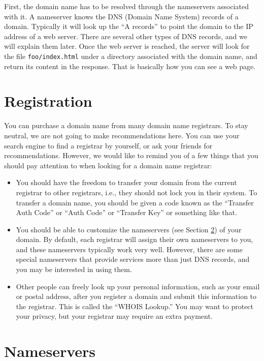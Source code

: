 \documentclass[12pt,]{krantz}
\theoremstyle{definition}
\theoremstyle{definition}
\theoremstyle{definition}
\theoremstyle{remark}
\begin{document}
First, the domain name has to be resolved through the nameservers
associated with it. A nameserver knows the DNS (Domain Name System)
records of a domain. Typically it will look up the ``A records'' to
point the domain to the IP address of a web server. There are several
other types of DNS records, and we will explain them later. Once the web
server is reached, the server will look for the file
\texttt{foo/index.html} under a directory associated with the domain
name, and return its content in the response. That is basically how you
can see a web page.

\section{Registration}\label{registration}

You can purchase a domain name from many domain name registrars. To stay
neutral, we are not going to make recommendations here. You can use your
search engine to find a registrar by yourself, or ask your friends for
recommendations. However, we would like to remind you of a few things
that you should pay attention to when looking for a domain name
registrar:

\begin{itemize}
\item
  You should have the freedom to transfer your domain from the current
  registrar to other registrars, i.e., they should not lock you in their
  system. To transfer a domain name, you should be given a code known as
  the ``Transfer Auth Code'' or ``Auth Code'' or ``Transfer Key'' or
  something like that.
\item
  You should be able to customize the nameservers (see Section
  \ref{nameservers}) of your domain. By default, each registrar will
  assign their own nameservers to you, and these nameservers typically
  work very well. However, there are some special nameservers that
  provide services more than just DNS records, and you may be interested
  in using them.
\item
  Other people can freely look up your personal information, such as
  your email or postal address, after you register a domain and submit
  this information to the registrar. This is called the ``WHOIS
  Lookup.'' You may want to protect your privacy, but your registrar may
  require an extra payment.
\end{itemize}

\section{Nameservers}\label{nameservers}
\end{document}
